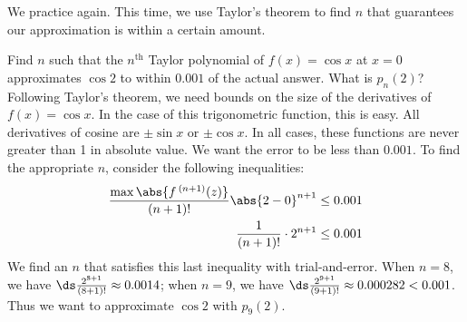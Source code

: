 We practice again. This time, we use Taylor's theorem to find $n$ that guarantees our approximation is within a certain amount.

\begin{example}\label{ex_taypoly4}
Find $n$ such that the $n^\text{th}$ Taylor polynomial of $f(x)=\cos x$ at $x=0$ approximates $\cos 2$ to within $0.001$ of the actual answer. What is $p_n(2)$?
\solution
Following Taylor's theorem, we need bounds on the size of the derivatives of $f(x)=\cos x$. In the case of this trigonometric function, this is easy. All derivatives of cosine are $\pm \sin x$ or $\pm \cos x$. In all cases, these functions are never greater than 1 in absolute value. We want the error to be less than $0.001$. To find the appropriate $n$, consider the following inequalities:
\begin{align*}
\frac{\max\abs{f\,^{(n+1)}(z)}}{(n+1)!}\abs{2-0}^{n+1} &\leq 0.001 \\
\frac1{(n+1)!}\cdot2^{n+1} &\leq 0.001
\end{align*}
We find an $n$ that satisfies this last inequality with trial-and-error. When $n=8$, we have $\ds \frac{2^{8+1}}{(8+1)!} \approx 0.0014$; when $n=9$, we have $\ds \frac{2^{9+1}}{(9+1)!} \approx 0.000282 <0.001$. Thus we want to approximate $\cos 2$ with $p_9(2)$.\bigskip



\end{example}

